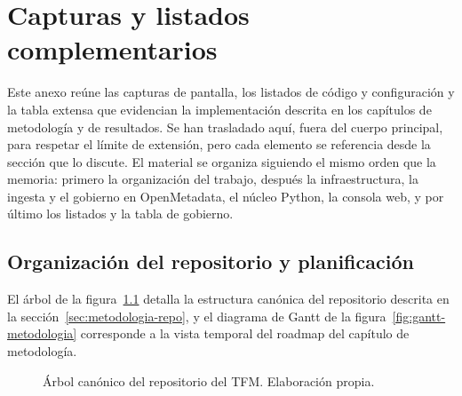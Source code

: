 \chapter{Capturas y listados complementarios}\label{ap:capturas}

Este anexo reúne las capturas de pantalla, los listados de código y configuración y la tabla extensa que evidencian la implementación descrita en los capítulos de metodología y de resultados. Se han trasladado aquí, fuera del cuerpo principal, para respetar el límite de extensión, pero cada elemento se referencia desde la sección que lo discute. El material se organiza siguiendo el mismo orden que la memoria: primero la organización del trabajo, después la infraestructura, la ingesta y el gobierno en OpenMetadata, el núcleo Python, la consola web, y por último los listados y la tabla de gobierno.

\section{Organización del repositorio y planificación}

El árbol de la figura~\ref{code:arbol-repositorio} detalla la estructura canónica del repositorio descrita en la sección~\ref{sec:metodologia-repo}, y el diagrama de Gantt de la figura~\ref{fig:gantt-metodologia} corresponde a la vista temporal del roadmap del capítulo de metodología.

\begin{figure}[ht]
\centering
\footnotesize
{}
\caption{Árbol canónico del repositorio del TFM. Elaboración propia.}
\label{code:arbol-repositorio}
\end{figure}

